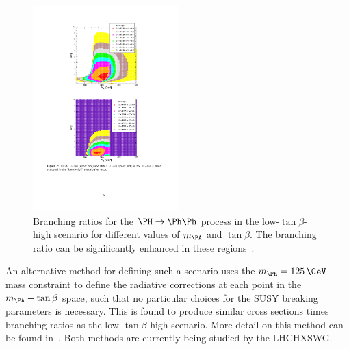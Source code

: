 \begin{figure}[htbp]
   \includegraphics[width=0.5\textwidth]{plots/theory/low-tanb-high-BR.pdf}
\caption[Branching ratios for the $\PH\to\Ph\Ph$ process in the low-$\tan\beta$-high
scenario for different values of $m_{\PA}$ and $\tan\beta$.]{
Branching ratios for the $\PH\to\Ph\Ph$ process in the low-$\tan\beta$-high
scenario for different values of $m_{\PA}$ and $\tan\beta$. The branching ratio
can be significantly enhanced in these regions~\cite{lowtanbhighwiki}.}
\label{fig:lowtanbhighBRs}
\end{figure}


An alternative method for defining such a scenario uses the $m_{\Ph}=125\,\GeV$
mass constraint to define the radiative corrections at each point in the
$m_{\PA}-\tan\beta$ space, such that no particular choices for the \ac{SUSY} breaking
parameters is necessary. This is found to produce similar cross sections times
branching ratios as the low-$\tan\beta$-high scenario. More detail on this
method can be found in~\cite{Djouadi:2015jea}. Both methods are currently being studied by the 
\ac{LHCHXSWG}. 



 



